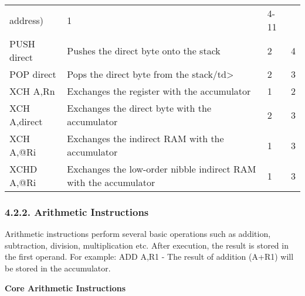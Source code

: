 \documentclass[
]{article}
\begin{document}
\begin{longtable}[]{@{}llll@{}}
address) & 1 & 4-11 \\
PUSH direct & Pushes the direct byte onto the stack & 2 & 4 \\
POP direct & Pops the direct byte from the stack/td\textgreater{} & 2 &
3 \\
XCH A,Rn & Exchanges the register with the accumulator & 1 & 2 \\
XCH A,direct & Exchanges the direct byte with the accumulator & 2 & 3 \\
XCH A,@Ri & Exchanges the indirect RAM with the accumulator & 1 & 3 \\
XCHD A,@Ri & Exchanges the low-order nibble indirect RAM with the
accumulator & 1 & 3 \\
\bottomrule
\end{longtable}

\hypertarget{422-arithmetic-instructions}{%
\subsubsection{4.2.2. Arithmetic
Instructions}\label{422-arithmetic-instructions}}

Arithmetic instructions perform several basic operations such as
addition, subtraction, division, multiplication etc. After execution,
the result is stored in the first operand. For example: ADD A,R1 - The
result of addition (A+R1) will be stored in the accumulator.

\textbf{Core Arithmetic Instructions}
\end{document}
